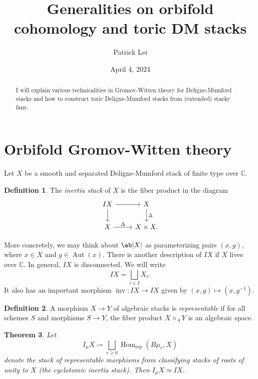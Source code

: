 \documentclass{amsart}
\title{Generalities on orbifold cohomology and toric DM stacks}
\author{Patrick Lei}
\date{April 4, 2024}
\newtheorem{thm}{Theorem}[section]
\theoremstyle{definition}
\newtheorem{defn}[thm]{Definition}
\theoremstyle{remark}
\theoremstyle{plain}
\theoremstyle{definition}
\theoremstyle{remark}
\newcommand{\C}{\mathbb{C}}
\newcommand{\mr}[1]{\mathrm{#1}}
\newcommand{\on}[1]{\operatorname{#1}}
\newcommand{\1}{\mathbf{1}}
\newcommand{\2}{\mathbf{2}}
\newcommand{\3}{\mathbf{3}}
\DeclareMathOperator{\Hom}{Hom}
\DeclareMathOperator{\Aut}{Aut}
\begin{document}
    
\begin{abstract}
    I will explain various technicalities in Gromov-Witten theory for Deligne-Mumford stacks and how to construct toric Deligne-Mumford stacks from (extended) stacky fans.
\end{abstract}

\maketitle

\tableofcontents

\section{Orbifold Gromov-Witten theory}%
\label{sec:Orbifold Gromov-Witten theory}

Let $X$ be a smooth and separated Deligne-Mumford stack of finite type over $\C$. 

\begin{defn}
    The \textit{inertia stack} of $X$ is the fiber product in the diagram
    \begin{equation*}
    \begin{tikzcd}
        IX \ar{r} \ar{d} & X \ar{d}{\Delta} \\
        X \ar{r}{\Delta} & X \times X.
    \end{tikzcd}
    \end{equation*}
\end{defn}
More concretely, we may think about $\ab|X|$ as parameterizing pairs $(x,g)$, where $x\in X$ and $g \in \Aut(x)$. There is another description of $IX$ if $X$ lives over $\C$. In general, $IX$ is disconnected. We will write
\[ IX = \bigsqcup_{i \in I} X_i. \]
It also has an important morphism $\on{inv} \colon IX \to IX$ given by $(x,g) \mapsto (x,g^{-1})$.

\begin{defn}
    A morphism $X \to Y$ of algebraic stacks is \textit{representable} if for all schemes $S$ and morphisms $S \to Y$, the fiber product $X \times_S Y$ is an algebraic space.
\end{defn}

\begin{thm}
    Let
    \[ I_{\mu} X \coloneqq \bigsqcup_{r \geq 0} \Hom_{\mr{rep}}(B\mu_r, X) \]
    denote the stack of representable morphisms from classifying stacks of roots of unity to $X$ (the \textit{cyclotomic inertia stack}). Then $I_{\mu} X \simeq IX$.
\end{thm}
\end{document}
